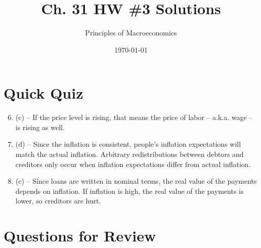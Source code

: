 \documentclass{article}
\title{Ch. 31 HW \#3 Solutions}
\author{Principles of Macroeconomics}
\date{\today}
\begin{document}
\maketitle

\section*{Quick Quiz}

\begin{enumerate}

\setcounter{enumi}{5}

\item (c) -- If the price level is rising, that means the price of labor -- a.k.a. wage -- is rising as well.

\item (d) -- Since the inflation is consistent, people's inflation expectations will match the actual inflation. Arbitrary redistributions between debtors and creditors only occur when inflation expectations differ from actual inflation.

\item (c) -- Since loans are written in nominal terms, the real value of the payments depends on inflation. If inflation is high, the real value of the payments is lower, so creditors are hurt. 

\end{enumerate}

\section*{Questions for Review}
\end{document}
